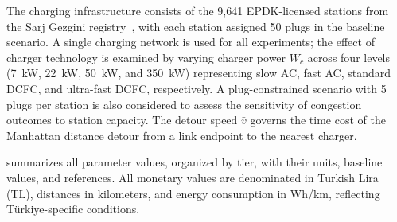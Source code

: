 The charging infrastructure consists of the 9,641 EPDK-licensed stations from the Sarj Gezgini registry~\cite{sarjgezgini_2025}, with each station assigned 50 plugs in the baseline scenario. A single charging network is used for all experiments; the effect of charger technology is examined by varying charger power $W_c$ across four levels (7~kW, 22~kW, 50~kW, and 350~kW) representing slow AC, fast AC, standard DCFC, and ultra-fast DCFC, respectively. A plug-constrained scenario with 5 plugs per station is also considered to assess the sensitivity of congestion outcomes to station capacity. The detour speed $\bar{v}$ governs the time cost of the Manhattan distance detour from a link endpoint to the nearest charger.

 summarizes all parameter values, organized by tier, with their units, baseline values, and references. All monetary values are denominated in Turkish Lira (TL), distances in kilometers, and energy consumption in Wh/km, reflecting T\"{u}rkiye-specific conditions.

